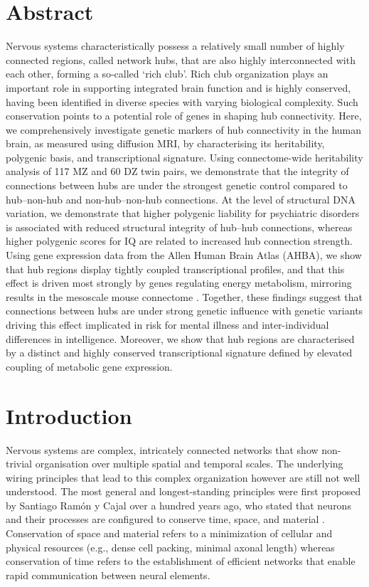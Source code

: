 \section*{Abstract}
Nervous systems characteristically possess a relatively small number of highly connected regions, called network hubs, that are also highly interconnected with each other, forming a so-called `rich club’. Rich club organization plays an important role in supporting integrated brain function and is highly conserved, having been identified in diverse species with varying biological complexity. Such conservation points to a potential role of genes in shaping hub connectivity. Here, we comprehensively investigate genetic markers of hub connectivity in the human brain, as measured using diffusion MRI, by characterising its heritability, polygenic basis, and transcriptional signature. Using connectome-wide heritability analysis of 117 MZ and 60 DZ twin pairs, we demonstrate that the integrity of connections between hubs are under the strongest genetic control compared to hub--non-hub and non-hub--non-hub connections. At the level of structural DNA variation, we demonstrate that higher polygenic liability for psychiatric disorders is associated with reduced structural integrity of hub--hub connections, whereas higher polygenic scores for IQ are related to increased hub connection strength. Using gene expression data from the Allen Human Brain Atlas (AHBA), we show that hub regions display  tightly coupled transcriptional profiles, and that this effect is driven most strongly by genes regulating energy metabolism, mirroring results in the mesoscale mouse connectome \citep{Fulcher2016}. Together, these findings suggest that connections between hubs are under strong genetic influence with genetic variants driving this effect implicated in risk for mental illness and inter-individual differences in intelligence. Moreover, we show that hub regions are characterised by a distinct and highly conserved transcriptional signature defined by elevated coupling of metabolic gene expression.

\section{Introduction}

Nervous systems are complex, intricately connected networks that show non-trivial organisation over multiple spatial and temporal scales. The underlying wiring principles that lead to this complex organization however are still not well understood. The most general and longest-standing principles were first proposed by Santiago Ram\'{o}n y Cajal over a hundred years ago, who stated that neurons and their processes are configured to conserve time, space, and material \citep{RamonyCajal1995}. Conservation of space and material refers to a minimization of cellular and physical resources (e.g., dense cell packing, minimal axonal length) whereas conservation of time refers to the establishment of efficient networks that enable rapid communication between neural elements.

